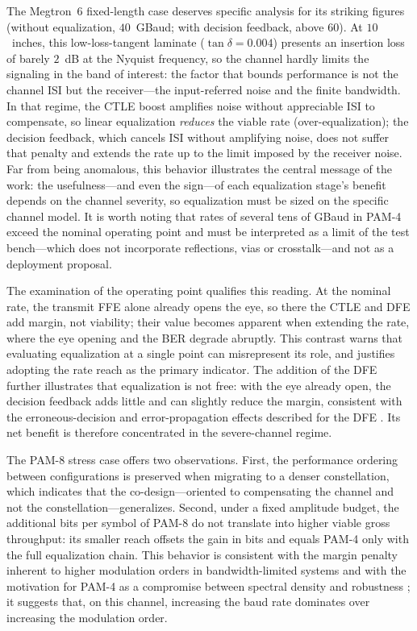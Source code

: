\documentclass[twocolumn]{USG}
\begin{document}
The Megtron~6 fixed-length case deserves specific analysis for its striking
figures (without equalization, $40$~GBaud; with decision feedback, above
$60$). At $10$~inches, this low-loss-tangent laminate ($\tan\delta=0.004$)
presents an insertion loss of barely $2$~dB at the Nyquist frequency, so the
channel hardly limits the signaling in the band of interest: the factor that
bounds performance is not the channel ISI but the receiver---the
input-referred noise and the finite bandwidth. In that regime, the CTLE
boost amplifies noise without appreciable ISI to compensate, so linear
equalization \emph{reduces} the viable rate (over-equalization); the decision
feedback, which cancels ISI without amplifying noise, does not suffer that
penalty and extends the rate up to the limit imposed by the receiver noise.
Far from being anomalous, this behavior illustrates the central message of
the work: the usefulness---and even the sign---of each equalization stage's
benefit depends on the channel severity, so equalization must be sized on the
specific channel model. It is worth noting that rates of several tens of
GBaud in PAM-4 exceed the nominal operating point and must be interpreted as
a limit of the test bench---which does not incorporate reflections, vias or
crosstalk---and not as a deployment proposal.

The examination of the operating point qualifies this reading. At the
nominal rate, the transmit FFE alone already opens the eye, so there the CTLE
and DFE add margin, not viability; their value becomes apparent when
extending the rate, where the eye opening and the BER degrade abruptly. This
contrast warns that evaluating equalization at a single point can
misrepresent its role, and justifies adopting the rate reach as the primary
indicator. The addition of the DFE further illustrates that equalization is
not free: with the eye already open, the decision feedback adds little and
can slightly reduce the margin, consistent with the erroneous-decision and
error-propagation effects described for the DFE \cite{10584882,9505189}. Its
net benefit is therefore concentrated in the severe-channel regime.

The PAM-8 stress case offers two observations. First, the performance
ordering between configurations is preserved when migrating to a denser
constellation, which indicates that the co-design---oriented to compensating
the channel and not the constellation---generalizes. Second, under a fixed
amplitude budget, the additional bits per symbol of PAM-8 do not translate
into higher viable gross throughput: its smaller reach offsets the gain in
bits and equals PAM-4 only with the full equalization chain. This behavior is
consistent with the margin penalty inherent to higher modulation orders in
bandwidth-limited systems \cite{8963973} and with the motivation for PAM-4 as
a compromise between spectral density and robustness \cite{7964959}; it
suggests that, on this channel, increasing the baud rate dominates over
increasing the modulation order.
\end{document}
